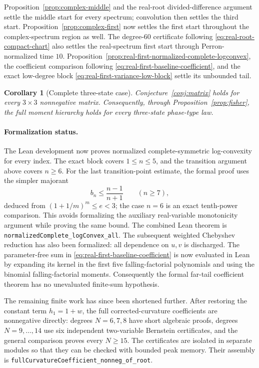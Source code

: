 \documentclass[11pt]{article}
\newtheorem{corollary}[theorem]{Corollary}
\theoremstyle{remark}
\begin{document}
Proposition~\ref{prop:complex-middle} and the real-root divided-difference
argument settle the middle start for every spectrum; convolution then settles
the third start.  Proposition~\ref{prop:complex-first} now settles the first
start throughout the complex-spectrum region as well.  The degree-$60$
certificate following \eqref{eq:real-root-compact-chart} also settles the
real-spectrum first start through Perron-normalized time $10$.
Proposition~\ref{prop:real-first-normalized-complete-logconvex}, the coefficient
comparison following \eqref{eq:real-first-baseline-coefficient}, and the exact
low-degree block \eqref{eq:real-first-variance-low-block} settle its unbounded
tail.

\begin{corollary}[Complete three-state case]
\label{cor:complete-three-state}
Conjecture~\ref{conj:matrix} holds for every $3\times3$ nonnegative matrix.
Consequently, through Proposition~\ref{prop:fisher}, the full moment hierarchy
holds for every three-state phase-type law.
\end{corollary}

\paragraph{Formalization status.}
The Lean development now proves normalized complete-symmetric log-convexity
for every index.  The exact block covers
$1\leq n\leq5$, and the transition argument above covers $n\geq6$.
For the last transition-point estimate, the formal proof uses the simpler
majorant
\[
 b_n\leq\frac{n-1}{n+1}\qquad(n\geq7),
\]
deduced from $(1+1/m)^m\leq e<3$; the case $n=6$ is an exact tenth-power
comparison.  This avoids formalizing the auxiliary real-variable monotonicity
argument while proving the same bound.  The combined Lean theorem is
\texttt{normalizedComplete\_logConvex\_all}.  The subsequent weighted
Chebyshev reduction has also been formalized: all dependence on $u,v$ is
discharged.  The parameter-free sum in
\eqref{eq:real-first-baseline-coefficient} is now evaluated in Lean by expanding
its kernel in the first five falling-factorial polynomials and using the
binomial falling-factorial moments.  Consequently the formal far-tail
coefficient theorem has no unevaluated finite-sum hypothesis.

The remaining finite work has since been shortened further.  After restoring
the constant term $h_1=1+w$, the full corrected-curvature coefficients are
nonnegative directly: degrees $N=6,7,8$ have short algebraic proofs, degrees
$N=9,\ldots,14$ use six independent two-variable Bernstein certificates, and
the general comparison proves every $N\geq15$.  The certificates are isolated
in separate modules so that they can be checked with bounded peak memory.
Their assembly is
\texttt{fullCurvatureCoefficient\_nonneg\_of\_root}.
\end{document}
